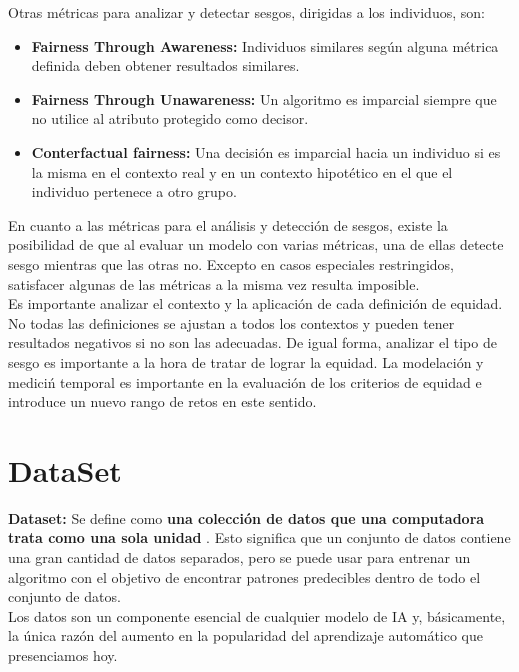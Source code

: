 \documentclass[runningheads,a4paper]{llncs}
\begin{document}
Otras m\'etricas para analizar y detectar sesgos, dirigidas a los individuos, \cite{Matt} son:
\begin{itemize}
\item {\bf Fairness Through Awareness:} Individuos similares seg\'un alguna m\'etrica definida deben obtener resultados similares.\\
\item {\bf Fairness Through Unawareness:} Un algoritmo es imparcial siempre que no utilice al atributo protegido como decisor.\\
\item {\bf Conterfactual fairness:} Una decisi\'on es imparcial hacia un individuo si es la misma en el contexto real y en un contexto hipot\'etico en el que el individuo pertenece a otro grupo.\\
\end{itemize}

En cuanto a las m\'etricas para el an\'alisis y detecci\'on de sesgos, existe la posibilidad
de que al evaluar un modelo con varias m\'etricas, una de ellas detecte sesgo mientras
que las otras no. Excepto en casos especiales restringidos, satisfacer algunas de las
m\'etricas a la misma vez resulta imposible.\\

Es importante analizar el contexto y la aplicaci\'on de cada definici\'on de equidad.
No todas las definiciones se ajustan a todos los contextos y pueden tener resultados negativos si no son las adecuadas. De igual forma, analizar el tipo de sesgo es
importante a la hora de tratar de lograr la equidad.
La modelaci\'on y medici\'n temporal es importante en la evaluaci\'on de los criterios
de equidad e introduce un nuevo rango de retos en este sentido.


\section{DataSet}
{\bf Dataset:} Se define como  {\bf una colecci\'on de datos que una computadora trata como una sola unidad} . Esto significa que un conjunto de datos contiene una gran cantidad de datos separados, pero se puede usar para entrenar un algoritmo con el objetivo de encontrar patrones predecibles dentro de todo el conjunto de datos.\\

Los datos son un componente esencial de cualquier modelo de IA y, b\'asicamente, la \'unica raz\'on del aumento en la popularidad del aprendizaje autom\'atico que presenciamos hoy.\\
\end{document}
